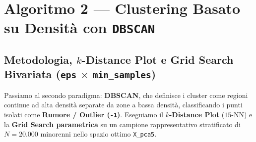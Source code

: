 \begin{table}[H]
\centering
\caption{Approfondimento K-Means con $k=4$: scissione del gruppo ad Alto Rischio nei due fenotipi \emph{Maratoneti Immersivi} (Cl.2) e \emph{Compulsivi FOMO} (Cl.3).}
\label{tab:kmeans_profile_4}
\end{table}

\section{Algoritmo 2 --- Clustering Basato su Densità con \texttt{DBSCAN}}
\label{sec:dbscan}

\subsection{Metodologia, $k$-Distance Plot e Grid Search Bivariata (\texttt{eps} $\times$ \texttt{min\_samples})}
Passiamo al secondo paradigma: \textbf{DBSCAN}, che definisce i cluster come regioni continue ad alta densità separate da zone a bassa densità, classificando i punti isolati come \textbf{Rumore / Outlier (\texttt{-1})}. Eseguiamo il \textbf{$k$-Distance Plot} ($15$-NN) e la \textbf{Grid Search parametrica} su un campione rappresentativo stratificato di $N = 20.000$ minorenni nello spazio ottimo \texttt{X\_pca5}.

